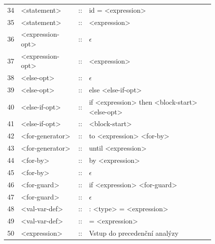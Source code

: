 \documentclass[11pt]{article}
\begin{document}
{{{\begin{figure}[H]
\begin{tabularx}{\textwidth}{r l c >{\raggedright\arraybackslash}X}
				  34 & <statement>       & :: & id = <expression>                                                   \\
				  35 & <statement>       & :: & <expression>                                                        \\
				  36 & <expression-opt>  & :: & \(\epsilon\)                                                        \\
				  37 & <expression-opt>  & :: & <expression>                                                        \\
				  38 & <else-opt>        & :: & \(\epsilon\)                                                        \\
				  39 & <else-opt>        & :: & else <else-if-opt>                                                  \\
				  40 & <else-if-opt>     & :: & if <expression> then <block-start> <else-opt>                       \\
				  41 & <else-if-opt>     & :: & <block-start>                                                       \\
				  42 & <for-generator>   & :: & to <expression> <for-by>                                            \\
				  43 & <for-generator>   & :: & until <expression>                                                  \\
				  44 & <for-by>          & :: & by <expression>                                                     \\
				  45 & <for-by>          & :: & \(\epsilon\)                                                        \\
				  46 & <for-guard>       & :: & if <expression> <for-guard>                                         \\
				  47 & <for-guard>       & :: & \(\epsilon\)                                                        \\
				  48 & <val-var-def>     & :: & : <type> = <expression>                                             \\
				  49 & <val-var-def>     & :: & = <expression>                                                      \\
				  50 & <expression>      & :: & Vstup do precedenční analýzy
			  \end{tabularx}
			  \label{fig::ll_grammar}
		  \end{figure}
	  }

}}
\end{document}
